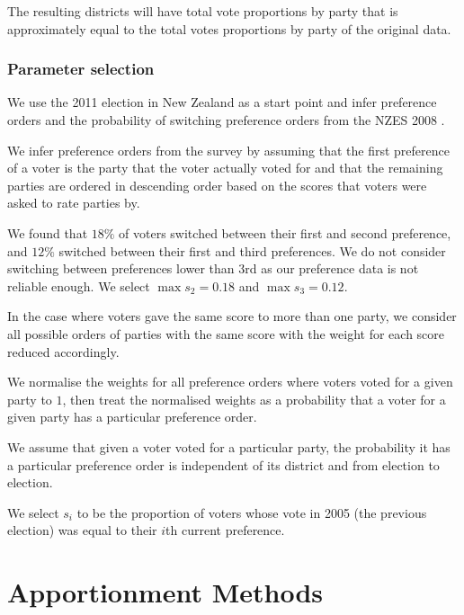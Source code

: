 \documentclass{article}
\begin{document}
The resulting districts will have total vote proportions by party that is approximately equal to the total votes proportions by party of the original data.

\subsubsection*{Parameter selection}

We use the 2011 election in New Zealand as a start point and infer preference orders and the probability of switching preference orders from the NZES 2008 \cite{nzes08}.

We infer preference orders from the survey by assuming that the first preference of a voter is the party that the voter actually voted for and that the remaining parties are ordered in descending order based on the scores that voters were asked to rate parties by.

We found that $18\%$ of voters switched between their first and second preference, and $12\%$ switched between their first and third preferences. We do not consider switching between preferences lower than 3rd as our preference data is not reliable enough. We select $\max {s_2}=0.18$ and $\max {s_3}=0.12$.

In the case where voters gave the same score to more than one party, we consider all possible orders of parties with the same score with the weight for each score reduced accordingly.

We normalise the weights for all preference orders where voters voted for a given party to $1$, then treat the normalised weights as a probability that a voter for a given party has a particular preference order.

We assume that given a voter voted for a particular party, the probability it has a particular preference order is independent of its district and from election to election.


We select $s_i$ to be the proportion of voters whose vote in 2005 (the previous election) was equal to their $i$th current preference.

\section{Apportionment Methods}
\label{sec:apportionment}
\end{document}
